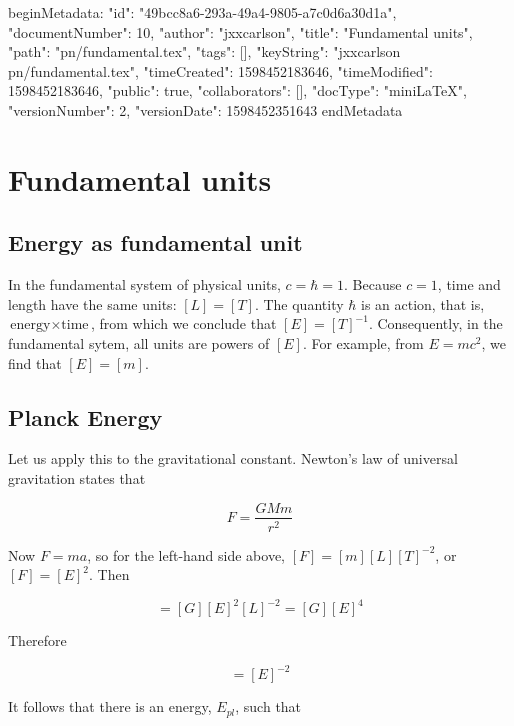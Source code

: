 beginMetadata:
{
    "id": "49bcc8a6-293a-49a4-9805-a7c0d6a30d1a",
    "documentNumber": 10,
    "author": "jxxcarlson",
    "title": "Fundamental units",
    "path": "pn/fundamental.tex",
    "tags": [],
    "keyString": "jxxcarlson pn/fundamental.tex",
    "timeCreated": 1598452183646,
    "timeModified": 1598452183646,
    "public": true,
    "collaborators": [],
    "docType": "miniLaTeX",
    "versionNumber": 2,
    "versionDate": 1598452351643
}
endMetadata

\section{Fundamental units}

\innertableofcontents

\subsection{Energy as fundamental unit}
In the fundamental system of  physical units, $c = \hbar = 1$. Because $c = 1$, time and length have the same units: $[L] = [T]$. The quantity $\hbar$ is
an action, that is, $\text{energy}\times \text{time}$, from which we conclude that $[E] = [T]^{-1}$.  Consequently, in the fundamental sytem, all units are powers of $[E]$.  For example, from $E = mc^2$, we find that $[E] = [m]$.
\medskip

\subsection{Planck Energy}

Let us apply this to the gravitational constant.  Newton's law of universal gravitation states that
\medskip

\begin{equation}
F = \frac{GMm}{r^2}
\end{equation}


Now $F  = ma$, so for the left-hand side above, $[F] = [m][L][T]^{-2}$, or $[F] = [E]^2$.  Then


\begin{equation}
[F] = [G][E]^2[L]^{-2} = [G][E]^4
\end{equation}


Therefore

\begin{equation}
[G] = [E]^{-2}
\end{equation}

It follows that there is an energy, $E_{pl}$, such that

